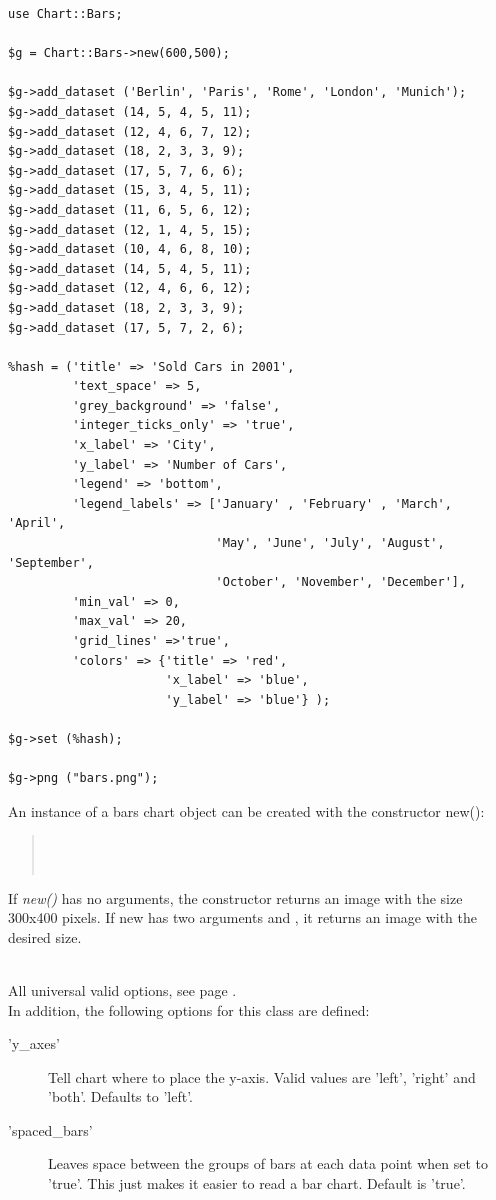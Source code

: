 \begin{verbatim}
use Chart::Bars;

$g = Chart::Bars->new(600,500);

$g->add_dataset ('Berlin', 'Paris', 'Rome', 'London', 'Munich');
$g->add_dataset (14, 5, 4, 5, 11);
$g->add_dataset (12, 4, 6, 7, 12);
$g->add_dataset (18, 2, 3, 3, 9);
$g->add_dataset (17, 5, 7, 6, 6);
$g->add_dataset (15, 3, 4, 5, 11);
$g->add_dataset (11, 6, 5, 6, 12);
$g->add_dataset (12, 1, 4, 5, 15);
$g->add_dataset (10, 4, 6, 8, 10);
$g->add_dataset (14, 5, 4, 5, 11);
$g->add_dataset (12, 4, 6, 6, 12);
$g->add_dataset (18, 2, 3, 3, 9);
$g->add_dataset (17, 5, 7, 2, 6);

%hash = ('title' => 'Sold Cars in 2001',
         'text_space' => 5,
         'grey_background' => 'false',
         'integer_ticks_only' => 'true',
         'x_label' => 'City',
         'y_label' => 'Number of Cars',
         'legend' => 'bottom',
         'legend_labels' => ['January' , 'February' , 'March', 'April',
                             'May', 'June', 'July', 'August', 'September',
                             'October', 'November', 'December'],
         'min_val' => 0,
         'max_val' => 20,
         'grid_lines' =>'true',
         'colors' => {'title' => 'red',
                      'x_label' => 'blue',
                      'y_label' => 'blue'} );

$g->set (%hash);

$g->png ("bars.png");

\end{verbatim}

\begin{Constructor} 
An instance of a bars chart object can be created with the constructor new():
\begin{quote}
\parindent 0pt
\\
\\
\end{quote}

If \textit{new()} has no arguments, 
the constructor returns an image with the size 300x400 pixels. 
If new has two arguments  and , 
it returns an image with the desired size.
\end{Constructor}

\Methods
{}\\[\parabstand]
%
\Attributes
All universal valid options, see page \pageref{options}. \\
In addition, the following options for this class are defined:
\begin{description}
\item['y\_axes'] Tell chart where to place the y-axis. 
                 Valid values are 'left', 'right' and 'both'. Defaults to 'left'.
                 
\item['spaced\_bars'] Leaves space between the groups of bars at each data point when set to 'true'.  
             This just makes it easier to read a bar chart.  Default is 'true'.
\end{description}